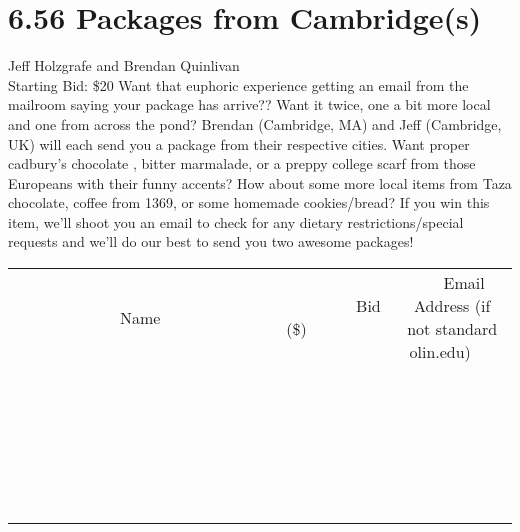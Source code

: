 \documentclass[11pt]{article}
\begin{document}
\section*{6.56 Packages from Cambridge(s)}
Jeff Holzgrafe and Brendan Quinlivan
\\
Starting Bid: \$20
\newline
Want that euphoric experience getting an email from the mailroom saying your package has arrive?? Want it twice, one a bit more local and one from across the pond? Brendan (Cambridge, MA) and Jeff (Cambridge, UK) will each send you a package from their respective cities.  Want proper cadbury's chocolate , bitter marmalade, or a preppy college scarf  from those Europeans with their funny accents?  How about some more local items from Taza chocolate, coffee from 1369, or some homemade cookies/bread? If you win this item, we’ll shoot you an email to check for any dietary restrictions/special requests and we’ll do our best to send you two awesome packages!
\\[6ex]
\begin{tabular}{c c c}
~~~~~~~~~~~~~Name~~~~~~~~~~~~~ & ~~~~~~~~~Bid (\$)~~~~~~~~~  & ~~~Email Address (if not standard olin.edu)~~~\\
 & & \\
\hline
 & & \\
\hline
 & & \\
\hline
 & & \\
\hline
 & & \\
\hline
 & & \\
\hline
 & & \\
\hline
 & & \\
\hline
 & & \\
\hline
 & & \\
\hline
 & & \\
\hline
 & & \\
\hline
 & & \\
\hline
 & & \\
\hline
 & & \\
\hline
 & & \\
\hline
 & & \\
\hline
 & & \\
\hline
 & & \\
\hline
 & & \\
\hline
 & & \\
\hline
 & & \\
\hline
 & & \\
\hline
 & & \\
\hline
 & & \\
\hline
 & & \\
\hline
\end{tabular}
\newpage
\end{document}
